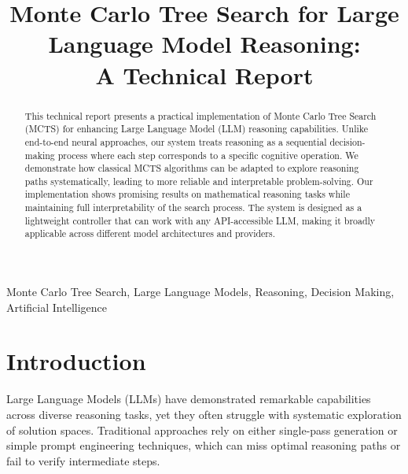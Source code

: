 \documentclass[conference]{IEEEtran}
\begin{document}
\title{Monte Carlo Tree Search for Large Language Model Reasoning:\\A Technical Report}

\author{
}

\maketitle

\begin{abstract}
This technical report presents a practical implementation of Monte Carlo Tree Search (MCTS) for enhancing Large Language Model (LLM) reasoning capabilities. Unlike end-to-end neural approaches, our system treats reasoning as a sequential decision-making process where each step corresponds to a specific cognitive operation. We demonstrate how classical MCTS algorithms can be adapted to explore reasoning paths systematically, leading to more reliable and interpretable problem-solving. Our implementation shows promising results on mathematical reasoning tasks while maintaining full interpretability of the search process. The system is designed as a lightweight controller that can work with any API-accessible LLM, making it broadly applicable across different model architectures and providers.
\end{abstract}

\begin{IEEEkeywords}
Monte Carlo Tree Search, Large Language Models, Reasoning, Decision Making, Artificial Intelligence
\end{IEEEkeywords}

\section{Introduction}

Large Language Models (LLMs) have demonstrated remarkable capabilities across diverse reasoning tasks, yet they often struggle with systematic exploration of solution spaces. Traditional approaches rely on either single-pass generation or simple prompt engineering techniques, which can miss optimal reasoning paths or fail to verify intermediate steps.
\end{document}

